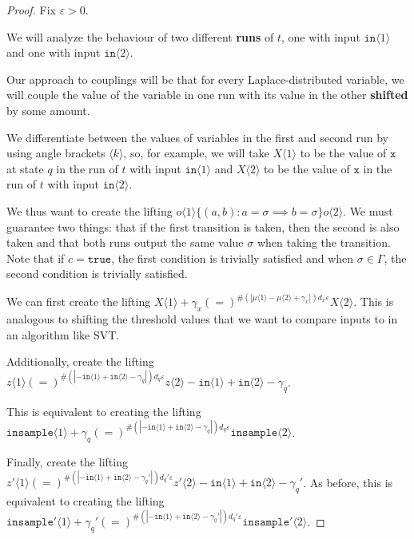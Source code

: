 \documentclass[12pt]{article}
\newcommand{\brangle}[1]{\langle #1 \rangle}
\theoremstyle{definition}
\begin{document}
\begin{proof}
Fix $\varepsilon>0$.

We will analyze the behaviour of two different \textbf{runs} of $t$, one with input $\texttt{in}\brangle{1}$ and one with input $\texttt{in}\brangle{2}$. 

Our approach to couplings will be that for every Laplace-distributed variable, we will couple the value of the variable in one run with its value in the other \textbf{shifted} by some amount. 

We differentiate between the values of variables in the first and second run by using angle brackets $\brangle{k}$, so, for example, we will take $X\brangle{1}$ to be the value of $\texttt{x}$ at state $q$ in the run of $t$ with input $\texttt{in}\brangle{1}$ and $X\brangle{2}$ to be the value of $\texttt{x}$ in the run of $t$ with input $\texttt{in}\brangle{2}$. 

We thus want to create the lifting $o\brangle{1}\{(a, b): a=\sigma\implies b=\sigma\}o\brangle{2}$. We must guarantee two things: that if the first transition is taken, then the second is also taken and that both runs output the same value $\sigma$ when taking the transition. Note that if $c = \texttt{true}$, the first condition is trivially satisfied and when $\sigma\in \Gamma$, the second condition is trivially satisfied. 

We can first create the lifting $X\brangle{1}+\gamma_x (=)^{\#(|\mu\brangle{1}-\mu\brangle{2}+\gamma_x|)d_x\varepsilon}X\brangle{2}$. This is analogous to shifting the threshold values that we want to compare inputs to in an algorithm like SVT. 

Additionally, create the lifting $z\brangle{1} (=)^{\#(|-\texttt{in}\brangle{1}+\texttt{in}\brangle{2}-\gamma_q|)d_q\varepsilon}z\brangle{2} - \texttt{in}\brangle{1}+\texttt{in}\brangle{2}-\gamma_q$. 

This is equivalent to creating the lifting $\texttt{insample}\brangle{1} +\gamma_q{(=)}^{\#(|-\texttt{in}\brangle{1}+\texttt{in}\brangle{2}-\gamma_q|)d_q\varepsilon}\texttt{insample}\brangle{2}$.

Finally, create the lifting $z'\brangle{1} (=)^{\#(|-\texttt{in}\brangle{1}+\texttt{in}\brangle{2}-\gamma_q'|)d_q'\varepsilon}z'\brangle{2} - \texttt{in}\brangle{1}+\texttt{in}\brangle{2}-\gamma_q'$. As before, this is equivalent to creating the lifting $\texttt{insample}'\brangle{1} +\gamma_q'{(=)}^{\#(|-\texttt{in}\brangle{1}+\texttt{in}\brangle{2}-\gamma_q'|)d_q'\varepsilon}\texttt{insample}'\brangle{2}$.


\end{proof}
\end{document}
